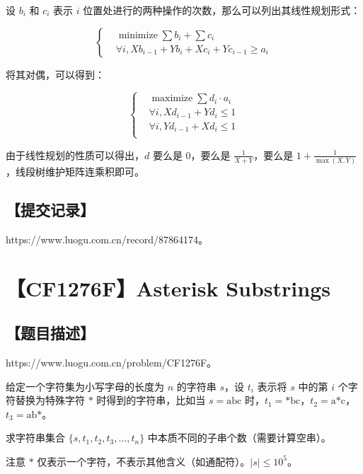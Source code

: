 \documentclass[UTF8,12pt,a4paper]{ctexart}
\begin{document}
	设 $b_i$ 和 $c_i$ 表示 $i$ 位置处进行的两种操作的次数，那么可以列出其线性规划形式：
	
	$$
	\left\{
	\begin{aligned}
		&\operatorname{minimize} \sum b_i+\sum c_i\\
		&\forall i, Xb_{i-1}+Yb_i+Xc_i+Yc_{i-1}\ge a_i
	\end{aligned}
	\right.
	$$
	
	将其对偶，可以得到：
	
	$$
	\left\{
	\begin{aligned}
		&\operatorname{maximize} \sum d_i\cdot a_i\\
		&\forall i, Xd_{i-1}+Yd_i\le 1\\
		&\forall i, Yd_{i-1}+Xd_i\le 1\\
	\end{aligned}
	\right.
	$$
	
	由于线性规划的性质可以得出，$d$ 要么是 $0$，要么是 $\frac 1{X+Y}$，要么是 $1+\frac 1{\max(X,Y)}$，线段树维护矩阵连乘积即可。
	
	
	\subsection*{【提交记录】}
	
	https://www.luogu.com.cn/record/87864174。
	
	
	\section*{【CF1276F】Asterisk Substrings}
	
	\subsection*{【题目描述】}
	
	https://www.luogu.com.cn/problem/CF1276F。
	
	给定一个字符集为小写字母的长度为 $n$ 的字符串 $s$，设 $t_i$ 表示将 $s$ 中的第 $i$ 个字符替换为特殊字符 $\text{*}$ 时得到的字符串，比如当 $s=\text{abc}$ 时，$t_1=\text{*bc}$，$t_2 = \text{a*c}$，$t_3 = \text{ab*}$。
	
	求字符串集合 $\{s,t_1,t_2,t_3,...,t_n\}$ 中本质不同的子串个数（需要计算空串）。
	
	注意 $\text{*}$ 仅表示一个字符，不表示其他含义（如通配符）。$|s|\le 10^5$。
	
\end{document}
